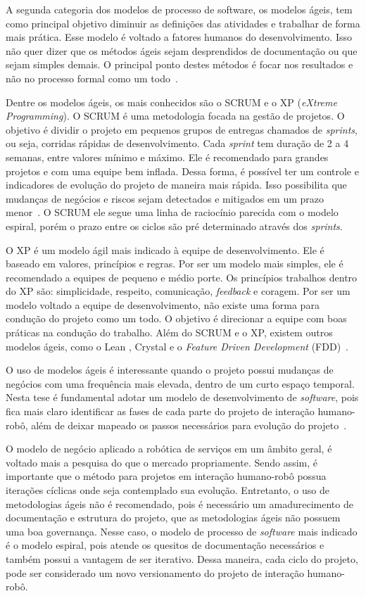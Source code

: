 A segunda categoria dos modelos de processo de software, os modelos ágeis, tem como principal objetivo diminuir as definições das atividades e trabalhar de forma mais prática. Esse modelo é voltado a fatores humanos do desenvolvimento. Isso não quer dizer que os métodos ágeis sejam desprendidos de documentação ou que sejam simples demais. O principal ponto destes métodos é focar nos resultados e não no processo formal como um todo~\cite{sommerville:2008}.

Dentre os modelos ágeis, os mais conhecidos são o SCRUM e o XP (\textit{eXtreme Programming}). O SCRUM é uma metodologia focada na gestão de projetos. O objetivo é dividir o projeto em pequenos grupos de entregas chamados de \textit{sprints}, ou seja, corridas rápidas de desenvolvimento. Cada \textit{sprint} tem duração de 2 a 4 semanas, entre valores mínimo e máximo. Ele é recomendado para grandes projetos e com uma equipe bem inflada. Dessa forma, é possível ter um controle e indicadores de evolução do projeto de maneira mais rápida. Isso possibilita que mudanças de negócios e riscos sejam detectados e mitigados em um prazo menor~\cite{sutherland:2016}. O SCRUM ele segue uma linha de raciocínio parecida com o modelo espiral, porém o prazo entre os ciclos são pré determinado através dos \textit{sprints}.

O XP é um modelo ágil mais indicado à equipe de desenvolvimento. Ele é baseado em valores, princípios e regras. Por ser um modelo mais simples, ele é recomendado a equipes de pequeno e médio porte. Os princípios trabalhos dentro do XP são: simplicidade, respeito, comunicação, \textit{feedback} e coragem. Por ser um modelo voltado a equipe de desenvolvimento, não existe uma forma para condução do projeto como um todo. O objetivo é direcionar a equipe com boas práticas na condução do trabalho. Além do SCRUM e o XP, existem outros modelos ágeis, como o Lean , Crystal e o \textit{Feature Driven Development} (FDD)~\cite{wazlawick:2013}.

O uso de modelos ágeis é interessante quando o projeto possui mudanças de negócios com uma frequência mais elevada, dentro de um curto espaço temporal. Nesta tese é fundamental adotar um modelo de desenvolvimento de \textit{software}, pois fica mais claro identificar as fases de cada parte do projeto de interação humano-robô, além de deixar mapeado os passos necessários para evolução do projeto~\cite{sommerville:2008, wazlawick:2013}.

O modelo de negócio aplicado a robótica de serviços em um âmbito geral, é voltado mais a pesquisa do que o mercado propriamente. Sendo assim, é importante que o método para projetos em interação humano-robô possua iterações cíclicas onde seja contemplado sua evolução. Entretanto, o uso de metodologias ágeis não é recomendado, pois é necessário um amadurecimento de documentação e estrutura do projeto, que as metodologias ágeis não possuem uma boa governança. Nesse caso, o modelo de processo de \textit{software} mais indicado é o modelo espiral, pois atende os quesitos de documentação necessários e também possui a vantagem de ser iterativo. Dessa maneira, cada ciclo do projeto, pode ser considerado um novo versionamento do projeto de interação humano-robô.

